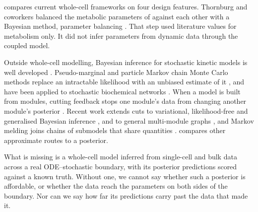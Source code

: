  compares current whole-cell frameworks on four design features.
Thornburg and coworkers balanced the metabolic parameters of \syn{} against each
other with a Bayesian method, parameter balancing \cite{lubitz2010parameter,thornburg2022fundamental}. That step used
literature values for metabolism only. It did not infer parameters from dynamic
data through the coupled model.

Outside whole-cell modelling, Bayesian inference for stochastic kinetic models is well developed
\cite{wilkinson2018stochastic}. Pseudo-marginal and particle Markov chain Monte Carlo methods
replace an intractable likelihood with an unbiased estimate of it
\cite{andrieu2009pseudomarginal,andrieu2010particle,doucet2015efficient}, and have been applied to
stochastic biochemical networks \cite{golightly2011bayesian}. When a model is built from modules,
cutting feedback stops one module's data from changing another module's posterior
\cite{liu2009modularization,plummer2015cuts,jacob2017better}. Recent work extends cuts to
variational, likelihood-free and generalised Bayesian inference
\cite{yu2023variational,chakraborty2023modularized,frazier2025cutting}, and to general
multi-module graphs \cite{liu2025general}, and Markov
melding joins chains of submodels that share quantities \cite{manderson2023combining}.
 compares other approximate routes to a posterior.

What is missing is a whole-cell model inferred from single-cell and bulk data across a real
ODE--stochastic boundary, with its posterior predictions scored against a known truth.
Without one, we cannot say whether such a posterior is affordable, or whether the data reach
the parameters on both sides of the boundary. Nor can we say how far its predictions carry
past the data that made it.

